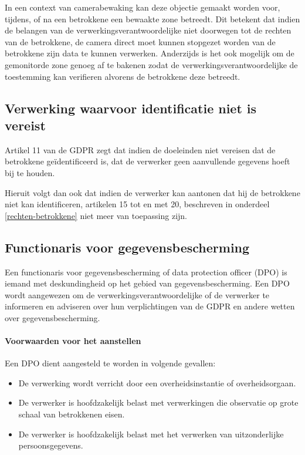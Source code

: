 In een context van camerabewaking kan deze objectie gemaakt worden voor, tijdens, of na een betrokkene een bewaakte zone betreedt. Dit betekent dat indien de belangen van de verwerkingsverantwoordelijke niet doorwegen tot de rechten van de betrokkene, de camera direct moet kunnen stopgezet worden van de betrokkene zijn data te kunnen verwerken. Anderzijds is het ook mogelijk om de gemonitorde zone genoeg af te bakenen zodat de verwerkingsverantwoordelijke de toestemming kan verifieren alvorens de betrokkene deze betreedt. \autocite{edpb2019guidelines}


\subsection{Verwerking waarvoor identificatie niet is vereist}
Artikel 11 van de GDPR zegt dat indien de doeleinden niet vereisen dat de betrokkene geïdentificeerd is, dat de verwerker geen aanvullende gegevens hoeft bij te houden.
\par
Hieruit volgt dan ook dat indien de verwerker kan aantonen dat hij de betrokkene niet kan identificeren, artikelen 15 tot en met 20, beschreven in onderdeel \ref{rechten-betrokkene} niet meer van toepassing zijn.

\subsection{Functionaris voor gegevensbescherming}
Een functionaris voor gegevensbescherming of data protection officer (DPO) is iemand met deskundingheid op het gebied van gegevensbescherming. Een DPO wordt aangewezen om de verwerkingsverantwoordelijke of de verwerker te informeren en adviseren over hun verplichtingen van de GDPR en andere wetten over gegevensbescherming.

\paragraph{Voorwaarden voor het aanstellen}
Een DPO dient aangesteld te worden in volgende gevallen:
\begin{itemize}
	\item De verwerking wordt verricht door een overheidsinstantie of overheidsorgaan.
	\item De verwerker is hoofdzakelijk belast met verwerkingen die observatie op grote schaal van betrokkenen eisen.
	\item De verwerker is hoofdzakelijk belast met het verwerken van uitzonderlijke persoonsgegevens.
\end{itemize}

